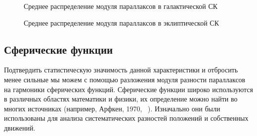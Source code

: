 \documentclass[14pt]{article} %
\begin{document}
\begin{figure}[h!]
\caption{Среднее распределение модуля параллаксов в галактической СК}
\label{img:sf_l}
\end{figure}

\begin{figure}[h!]
\caption{Среднее распределение модуля параллаксов в эклиптической СК}
\label{img:sf_lo}
\end{figure}


\subsection{Сферические функции}\label{sistem}  
Подтвердить статистическую значимость данной характеристики и отбросить менее сильные мы можем с помощью разложения модуля разности параллаксов на гармоники сферических функций. Сферические функции широко используются в различных областях математики и физики, их определение можно найти во многих источниках (например, Арфкен, 1970, ~\cite{book:arfken}). Изначально они были использованы для анализа систематических разностей положений и собственных движений. 
\end{document}
